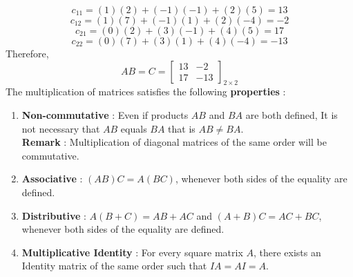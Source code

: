 \documentclass[12pt, letterpaper]{article}
\begin{document}
$$c_{11} = (1)(2) + (-1)(-1) + (2)(5) = 13$$
$$c_{12} = (1)(7) + (-1)(1) + (2)(-4) = -2$$
$$c_{21} = (0)(2) + (3)(-1) + (4)(5) = 17$$ 
$$c_{22} = (0)(7) + (3)(1) + (4)(-4) = -13$$
Therefore, 
\begin{displaymath}
AB = C = \begin{bmatrix}
13 & -2\\
17 & -13
\end{bmatrix}_{2 \times 2}
\end{displaymath}
The multiplication of matrices satisfies the following \textbf{properties} : 
\begin{enumerate}
    \item \textbf{Non-commutative} : Even if products $AB$ and $BA$ are both defined, It is not necessary that $AB$ equals $BA$ that is $AB \neq BA$.\\
    \textbf{Remark} : Multiplication of diagonal matrices of the same order will be commutative.
    \item \textbf{Associative} : $(AB)C = A(BC)$, whenever both sides of the equality are defined.
    \item \textbf{Distributive} : $A(B+C) = AB + AC$ and $(A+B)C = AC + BC$, whenever both sides of the equality are defined.
    \item \textbf{Multiplicative Identity} : For every square matrix $A$, there exists an Identity matrix of the same order such that $IA = AI = A$.
\end{enumerate}
\end{document}
